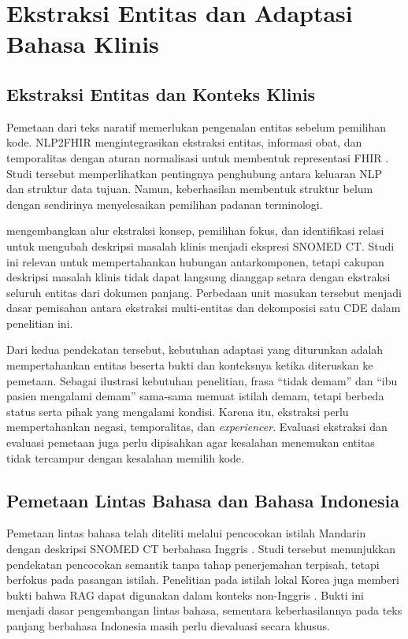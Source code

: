 \section{Ekstraksi Entitas dan Adaptasi Bahasa Klinis}
\label{sec:tinjauan-ekstraksi-bahasa}

\subsection{Ekstraksi Entitas dan Konteks Klinis}

Pemetaan dari teks naratif memerlukan pengenalan entitas sebelum pemilihan kode. NLP2FHIR mengintegrasikan ekstraksi entitas, informasi obat, dan temporalitas dengan aturan normalisasi untuk membentuk representasi FHIR \citep{hong_developing_2019}. Studi tersebut memperlihatkan pentingnya penghubung antara keluaran NLP dan struktur data tujuan. Namun, keberhasilan membentuk struktur belum dengan sendirinya menyelesaikan pemilihan padanan terminologi.

\citet{peterson_automating_2020} mengembangkan alur ekstraksi konsep, pemilihan fokus, dan identifikasi relasi untuk mengubah deskripsi masalah klinis menjadi ekspresi SNOMED CT. Studi ini relevan untuk mempertahankan hubungan antarkomponen, tetapi cakupan deskripsi masalah klinis tidak dapat langsung dianggap setara dengan ekstraksi seluruh entitas dari dokumen panjang. Perbedaan unit masukan tersebut menjadi dasar pemisahan antara ekstraksi multi-entitas dan dekomposisi satu CDE dalam penelitian ini.

Dari kedua pendekatan tersebut, kebutuhan adaptasi yang diturunkan adalah mempertahankan entitas beserta bukti dan konteksnya ketika diteruskan ke pemetaan. Sebagai ilustrasi kebutuhan penelitian, frasa ``tidak demam'' dan ``ibu pasien mengalami demam'' sama-sama memuat istilah demam, tetapi berbeda status serta pihak yang mengalami kondisi. Karena itu, ekstraksi perlu mempertahankan negasi, temporalitas, dan \textit{experiencer}. Evaluasi ekstraksi dan evaluasi pemetaan juga perlu dipisahkan agar kesalahan menemukan entitas tidak tercampur dengan kesalahan memilih kode.

\subsection{Pemetaan Lintas Bahasa dan Bahasa Indonesia}

Pemetaan lintas bahasa telah diteliti melalui pencocokan istilah Mandarin dengan deskripsi SNOMED CT berbahasa Inggris \citep{chen_automatic_2022}. Studi tersebut menunjukkan pendekatan pencocokan semantik tanpa tahap penerjemahan terpisah, tetapi berfokus pada pasangan istilah. Penelitian pada istilah lokal Korea juga memberi bukti bahwa RAG dapat digunakan dalam konteks non-Inggris \citep{huh_comparative_2025}. Bukti ini menjadi dasar pengembangan lintas bahasa, sementara keberhasilannya pada teks panjang berbahasa Indonesia masih perlu dievaluasi secara khusus.

